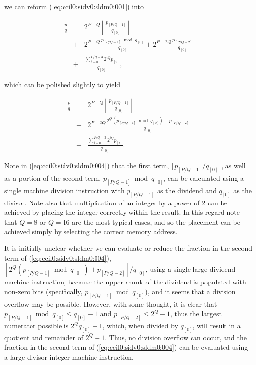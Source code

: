 \noindent{}we can reform (\ref{eq:ccil0:sidv0:sldm0:001}) into

\begin{eqnarray}
\nonumber
\frac{p}{q} & = &   2^{P-Q} \left\lfloor{\frac{p_{[P/Q-1]}}{q_{[0]}}}\right\rfloor \\
\label{eq:ccil0:sidv0:sldm0:003}
            & + &   2^{P-Q} \frac{p_{[P/Q-1]}\bmod q_{[0]}}{q_{[0]}}
                  + 2^{P-2Q} \frac{p_{[P/Q-2]}}{q_{[0]}}  \\
\nonumber   & + &   \frac{\sum_{i=0}^{P/Q-3} 2^{iQ} p_{[i]}}{q_{[0]}} ,
\end{eqnarray}

\noindent{}which can be polished slightly to yield

\begin{eqnarray}
\nonumber
\frac{p}{q} & = &   2^{P-Q} \left\lfloor{\frac{p_{[P/Q-1]}}{q_{[0]}}}\right\rfloor \\
\label{eq:ccil0:sidv0:sldm0:004}
            & + &   2^{P-2Q} \frac{2^Q (p_{[P/Q-1]}\bmod q_{[0]}) + p_{[P/Q-2]}}{q_{[0]}} \\
\nonumber   & + &   \frac{\sum_{i=0}^{P/Q-3} 2^{iQ} p_{[i]}}{q_{[0]}} .
\end{eqnarray}

Note in (\ref{eq:ccil0:sidv0:sldm0:004}) that the first term, 
$\lfloor{}p_{[P/Q-1]} / q_{[0]}\rfloor$, as well as
a portion of the second term, $p_{[P/Q-1]}\bmod q_{[0]}$, can be 
calculated using a single machine division instruction with
$p_{[P/Q-1]}$ as the dividend and $q_{[0]}$ as the divisor.
Note also that multiplication of an integer by a power of 2
can be achieved by placing the integer correctly within the 
result.  In this regard note that $Q=8$ or $Q=16$ are
the most typical cases, and so the placement can be achieved simply
by selecting the correct memory address.

It is initially unclear whether we can evaluate or reduce the fraction in the 
second term of (\ref{eq:ccil0:sidv0:sldm0:004}),
$[2^Q (p_{[P/Q-1]}\bmod q_{[0]}) + p_{[P/Q-2]}] / q_{[0]}$,
using a single large dividend machine instruction, because
the upper chunk of the dividend is populated with non-zero bits
(specifically, $p_{[P/Q-1]}\bmod q_{[0]}$), and it seems that 
a division overflow may be possible.  However, with some thought,
it is clear that $p_{[P/Q-1]}\bmod q_{[0]} \leq q_{[0]} - 1$ and 
$p_{[P/Q-2]} \leq 2^Q - 1$, thus the largest numerator possible
is $2^Q q_{[0]} - 1$, which, when divided by $q_{[0]}$, will result
in a quotient and remainder of $2^Q - 1$.  Thus, no division overflow
can occur, and the fraction in the  
second term of (\ref{eq:ccil0:sidv0:sldm0:004}) can be evaluated
using a large divisor integer machine instruction.

